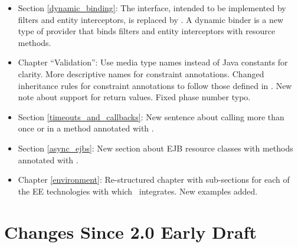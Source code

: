 \begin{itemize}
\item Section \ref{dynamic_binding}: The  interface, intended to be implemented by filters and entity interceptors, is replaced by . A dynamic binder is a new type of provider that binds filters and entity interceptors with resource methods. 
\item Chapter ``Validation'': Use media type names instead of Java constants for clarity. More descriptive names for constraint annotations. Changed inheritance rules for constraint annotations to follow those defined in \cite{bv11}. New note about  support for return values. Fixed phase number typo.
\item Section \ref{timeouts_and_callbacks}: New sentence about calling  more than once or in a method annotated with .
\item Section \ref{async_ejbs}: New section about EJB resource classes with methods annotated with .
\item Chapter \ref{environment}: Re-structured chapter with sub-sections for each of the EE technologies with which \jaxrs\ integrates. New examples added.
\end{itemize}

\section{Changes Since 2.0 Early Draft}

